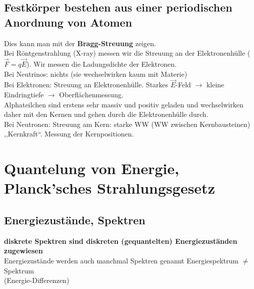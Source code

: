 \subsection{Festkörper bestehen aus einer periodischen Anordnung von Atomen}

Dies kann man mit der \textbf{Bragg-Streuung} zeigen.\\[5pt]
Bei Röntgenstrahlung (X-ray) messen wir die Streuung an der Elektronenhülle ($ \vec{F} = q \vec{E} $). Wir messen die Ladungsdichte der Elektronen.\\
Bei Neutrinos: nichts (sie wechselwirken kaum mit Materie)\\
Bei Elektronen: Streuung an Elektronenhülle. Starkes $ \vec{E} $-Feld $ \rightarrow $ kleine Eindringtiefe $ \rightarrow $ Oberflächenmessung.\\
Alphateilchen sind erstens sehr massiv und positiv geladen und wechselwirken daher mit den Kernen und gehen durch die Elektronenhülle durch.\\
Bei Neutronen: Streuung am Kern: starke WW (WW zwischen Kernbausteinen) ,,Kernkraft``. Messung der Kernpositionen.\\

\section{Quantelung von Energie, Planck'sches Strahlungsgesetz}

\subsection{Energiezustände, Spektren}

\begin{minipage}{.6\linewidth}
	\textbf{diskrete Spektren sind diskreten (gequantelten) Energiezuständen zugewiesen}\\
	Energiezustände werden auch manchmal Spektren genannt Energiespektrum $ \neq $ Spektrum \\(Energie-Differenzen)
\end{minipage}%
\begin{minipage}{.4\linewidth}
	\flushright
\end{minipage}%

